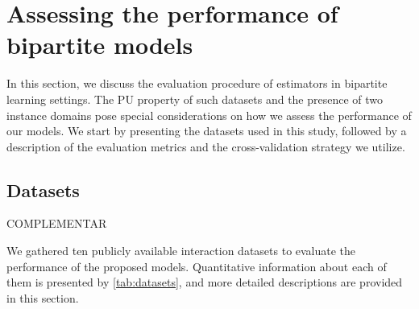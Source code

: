 \section{Assessing the performance of bipartite models}
\label{sec:experiments}

In this section, we discuss the evaluation procedure of estimators in bipartite learning settings. 
The PU property of such datasets and the presence of two instance domains pose special considerations on how we assess the performance of our models.
We start by presenting the datasets used in this study, followed by a description of the evaluation metrics and the cross-validation strategy we utilize.

\subsection{Datasets}
\label{sec:datasets}

COMPLEMENTAR %

We gathered ten publicly available interaction datasets to evaluate the performance of the proposed models. Quantitative information about each of them is presented by \autoref{tab:datasets}, and more detailed descriptions are provided in this section.


